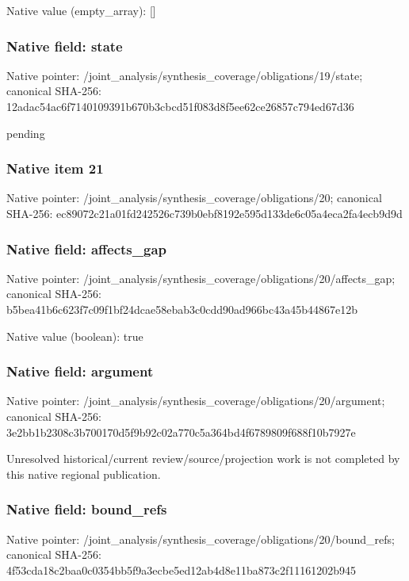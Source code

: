 \documentclass[10pt,a4paper]{article}
\begin{document}
Native value (empty\_\allowbreak{}array): []

\subsubsection{Native field: state}
Native pointer: /joint\_\allowbreak{}analysis/synthesis\_\allowbreak{}coverage/obligations/19/state; canonical SHA-256: 12adac54ac6f7140109391b670b3cbcd51f083d8f5ee62ce26857c794ed67d36

\begingroup\raggedright\sloppy pending\par\endgroup

\subsubsection{Native item 21}
Native pointer: /joint\_\allowbreak{}analysis/synthesis\_\allowbreak{}coverage/obligations/20; canonical SHA-256: ec89072c21a01fd242526c739b0ebf8192e595d133de6c05a4eca2fa4ecb9d9d

\subsubsection{Native field: affects\_\allowbreak{}gap}
Native pointer: /joint\_\allowbreak{}analysis/synthesis\_\allowbreak{}coverage/obligations/20/affects\_\allowbreak{}gap; canonical SHA-256: b5bea41b6c623f7c09f1bf24dcae58ebab3c0cdd90ad966bc43a45b44867e12b

Native value (boolean): true

\subsubsection{Native field: argument}
Native pointer: /joint\_\allowbreak{}analysis/synthesis\_\allowbreak{}coverage/obligations/20/argument; canonical SHA-256: 3e2bb1b2308c3b700170d5f9b92c02a770c5a364bd4f6789809f688f10b7927e

\begingroup\raggedright\sloppy Unresolved historical/\allowbreak{}current review/\allowbreak{}source/\allowbreak{}projection work is not completed by this native regional publication.\par\endgroup

\subsubsection{Native field: bound\_\allowbreak{}refs}
Native pointer: /joint\_\allowbreak{}analysis/synthesis\_\allowbreak{}coverage/obligations/20/bound\_\allowbreak{}refs; canonical SHA-256: 4f53cda18c2baa0c0354bb5f9a3ecbe5ed12ab4d8e11ba873c2f11161202b945
\end{document}
